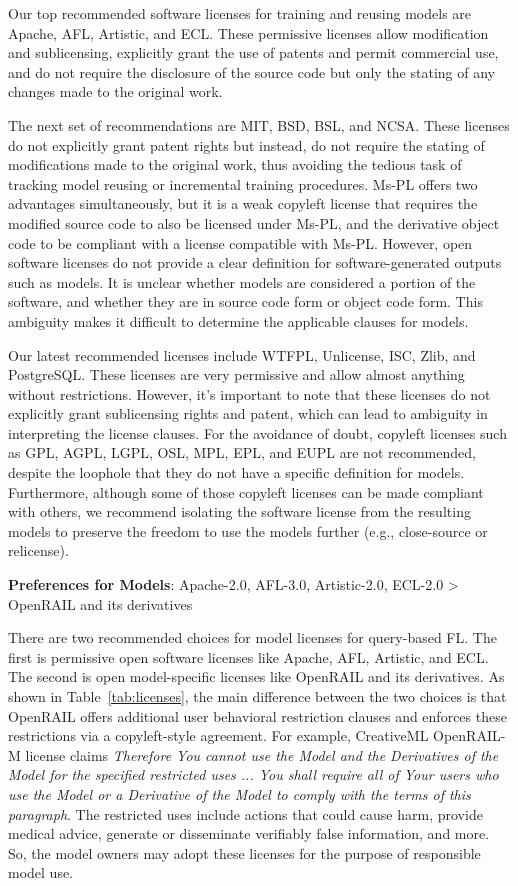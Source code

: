   Our top recommended software licenses for training and reusing models are Apache, AFL, Artistic, and ECL.
  These permissive licenses allow modification and sublicensing, explicitly grant the use of patents and permit commercial use, and do not require the disclosure of the source code but only the stating of any changes made to the original work.

  The next set of recommendations are MIT, BSD, BSL, and NCSA. 
  These licenses do not explicitly grant patent rights but instead, do not require the stating of modifications made to the original work, thus avoiding the tedious task of tracking model reusing or incremental training procedures. 
  Ms-PL offers two advantages simultaneously, but it is a weak copyleft license that requires the modified source code to also be licensed under Ms-PL, and the derivative object code to be compliant with a license compatible with Ms-PL.
  However, open software licenses do not provide a clear definition for software-generated outputs such as models. 
  It is unclear whether models are considered a portion of the software, and whether they are in source code form or object code form. 
  This ambiguity makes it difficult to determine the applicable clauses for models.
  
  Our latest recommended licenses include WTFPL, Unlicense, ISC, Zlib, and PostgreSQL.
  These licenses are very permissive and allow almost anything without restrictions.
  However, it's important to note that these licenses do not explicitly grant sublicensing rights and patent, which can lead to ambiguity in interpreting the license clauses.
  For the avoidance of doubt, copyleft licenses such as GPL, AGPL, LGPL, OSL, MPL, EPL, and EUPL are not recommended, despite the loophole that they do not have a specific definition for models.
  Furthermore, although some of those copyleft licenses can be made compliant with others, we recommend isolating the software license from the resulting models to preserve the freedom to use the models further (e.g., close-source or relicense).
  
  \textbf{Preferences for Models}: Apache-2.0, AFL-3.0, Artistic-2.0, ECL-2.0 > OpenRAIL and its derivatives
  
  There are two recommended choices for model licenses for query-based FL. 
  The first is permissive open software licenses like Apache, AFL, Artistic, and ECL. 
  The second is open model-specific licenses like OpenRAIL and its derivatives.
  As shown in Table~\ref{tab:licenses}, the main difference between the two choices is that OpenRAIL offers additional user behavioral restriction clauses and enforces these restrictions via a copyleft-style agreement.
  For example, CreativeML OpenRAIL-M license claims \textit{Therefore You cannot use the Model and the Derivatives of the Model for the specified restricted uses ... You shall require all of Your users who use the Model or a Derivative of the Model to comply with the terms of this paragraph}.
  The restricted uses include actions that could cause harm, provide medical advice, generate or disseminate verifiably false information, and more.
  So, the model owners may adopt these licenses for the purpose of responsible model use.


